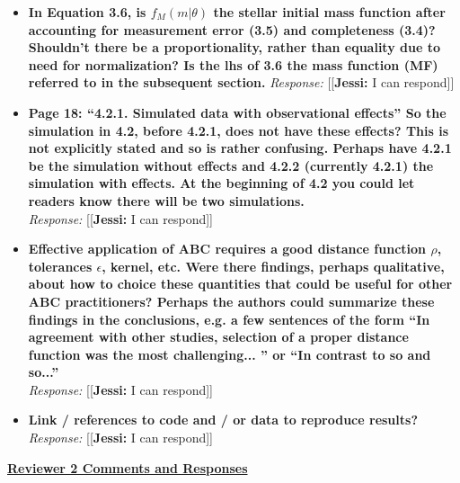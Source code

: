 \documentclass[11pt, oneside]{article}   	%
\newcommand{\jessi}[1]{{\color{blue}[[\textbf{Jessi: }#1]]}}
\begin{document}
\begin{itemize}
\item {\bf In Equation 3.6, is $f_M (m|\theta)$ the stellar initial mass function after accounting for measurement error (3.5) and completeness (3.4)? Shouldn't there be a proportionality, rather than equality due to need for normalization? Is the lhs of 3.6 the mass function (MF) referred to in the subsequent section.}
\noindent \emph{Response:} \jessi{I can respond}
\bigskip

\item {\bf Page 18: ``4.2.1. Simulated data with observational effects'' So the simulation in 4.2, before 4.2.1, does not have these effects? This is not explicitly stated and so is rather confusing. Perhaps have 4.2.1 be the simulation without effects and 4.2.2 (currently 4.2.1) the simulation with effects. At the beginning of 4.2 you could let readers know there will be two simulations. }\\
\noindent \emph{Response:} \jessi{I can respond}
\bigskip

\item {\bf Effective application of ABC requires a good distance function $\rho$, tolerances $\epsilon$, kernel, etc. Were there findings, perhaps qualitative, about how to choice these quantities that could be useful for other ABC practitioners? Perhaps the authors could summarize these findings in the conclusions, e.g. a few sentences of the form ``In agreement with other studies, selection of a proper distance function was the most challenging... '' or ``In contrast to so and so...'' }\\
\noindent \emph{Response:} \jessi{I can respond}
\bigskip

\item {\bf Link / references to code and / or data to reproduce results?} \\
\noindent \emph{Response:} \jessi{I can respond}
\bigskip
\end{itemize}



\noindent \underline{\bf Reviewer 2 Comments and Responses}
\end{document}

